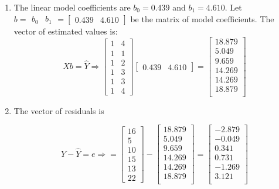 \documentclass[12pt, letterpaper]{article}
\begin{document}
\begin{enumerate}
\item The linear model coefficients are $b_{0}=0.439$ and $b_{1}=4.610$. Let $b=\begin{matrix}
b_{0} & b_{1}
\end{matrix}=
\begin{bmatrix}
0.439 & 4.610
\end{bmatrix}$ be the matrix of model coefficients. The vector of estimated values is: $$Xb= \hat{Y} \Rightarrow 
\begin{bmatrix}
1 & 4\\ 1 & 1\\ 1 & 2\\ 1&3\\ 1&3\\ 1&4
\end{bmatrix}
\begin{bmatrix}
0.439 & 4.610
\end{bmatrix} = 
\begin{bmatrix}
18.879 \\
 5.049 \\
 9.659 \\
 14.269 \\
 14.269 \\
 18.879 \\
\end{bmatrix}$$

\item The vector of residuals is

$$Y-\hat{Y} = e \Rightarrow = 
\begin{bmatrix}
16 \\ 5 \\ 10\\ 15\\ 13\\ 22
\end{bmatrix} - 
\begin{bmatrix}
18.879 \\
 5.049 \\
 9.659 \\
 14.269 \\
 14.269 \\
 18.879 \\
\end{bmatrix} =
\begin{bmatrix}
-2.879 \\
 -0.049 \\
 0.341 \\
 0.731 \\
 -1.269 \\
 3.121 \\
\end{bmatrix}$$


\end{enumerate}
\end{document}
